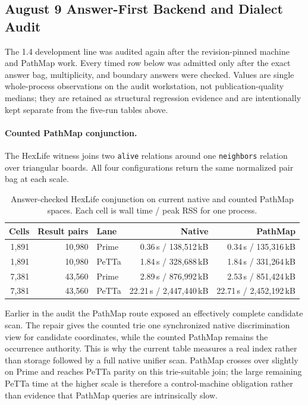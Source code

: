 \documentclass[11pt]{article}
\newcommand{\code}[1]{\texttt{#1}}
\newcommand{\PeTTa}{\textup{PeTTa}}
\newcommand{\PathMap}{\textup{PathMap}}
\begin{document}
\subsection{August 9 Answer-First Backend and Dialect Audit}
\label{sec:august-backend-audit}

The 1.4 development line was audited again after the revision-pinned
machine and \PathMap{} work.  Every timed row below was admitted only after
the exact answer bag, multiplicity, and boundary answers were checked.
Values are single whole-process observations on the audit workstation, not
publication-quality medians; they are retained as structural regression
evidence and are intentionally kept separate from the five-run tables above.

\paragraph{Counted \PathMap{} conjunction.}
The HexLife witness joins two \code{alive} relations around one
\code{neighbors} relation over triangular boards.
All four configurations return the same normalized pair bag at each scale.

\begin{table}[htbp]
\centering
\begin{tabular}{rrlrr}
\toprule
Cells & Result pairs & Lane & Native & \PathMap{} \\
\midrule
1{,}891 & 10{,}980 & Prime & 0.36\,s / 138{,}512\,kB & 0.34\,s / 135{,}316\,kB \\
1{,}891 & 10{,}980 & \PeTTa{} & 1.84\,s / 328{,}688\,kB & 1.84\,s / 331{,}264\,kB \\
7{,}381 & 43{,}560 & Prime & 2.89\,s / 876{,}992\,kB & 2.53\,s / 851{,}424\,kB \\
7{,}381 & 43{,}560 & \PeTTa{} & 22.21\,s / 2{,}447{,}440\,kB & 22.71\,s / 2{,}452{,}192\,kB \\
\bottomrule
\end{tabular}
\caption{Answer-checked HexLife conjunction on current native and counted
\PathMap{} spaces.  Each cell is wall time / peak RSS for one process.}
\label{tab:hexlife-pathmap-current}
\end{table}

Earlier in the audit the \PathMap{} route exposed an effectively complete
candidate scan.  The repair gives the counted trie one synchronized native
discrimination view for candidate coordinates, while the counted \PathMap{}
remains the occurrence authority.  This is why the current table measures a
real index rather than storage followed by a full native unifier scan.
\PathMap{} crosses over slightly on Prime and reaches \PeTTa{} parity on this
trie-suitable join; the large remaining \PeTTa{} time at the higher scale is
therefore a control-machine obligation rather than evidence that \PathMap{}
queries are intrinsically slow.
\end{document}
